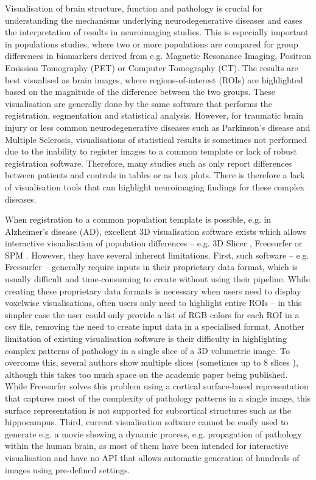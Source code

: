 \documentclass{llncs}
\begin{document}
Visualisation of brain structure, function and pathology is crucial for understanding the mechanisms underlying neurodegenerative diseases and eases the interpretation of results in neuroimaging studies. This is especially important in populations studies, where two or more populations are compared for group differences in biomarkers derived from e.g. Magnetic Resonance Imaging, Positron Emission Tomography (PET) or Computer Tomography (CT). The results are best visualised as brain images, where regions-of-interest (ROIs) are highlighted based on the magnitude of the difference between the two groups. These visualisation are generally done by the same software that performs the registration, segmentation and statistical analysis. However, for traumatic brain injury or less common neurodegenerative diseases such as Parkinson's disease and Multiple Sclerosis, visualisations of statistical results is sometimes not performed due to the inability to register images to a common template or lack of robust registration software. Therefore, many studies such as \cite{coughlin2015neuroinflammation,mak2014subcortical,schoonheim2012subcortical} only report differences between patients and controls in tables or as box plots. There is therefore a lack of visualisation tools that can highlight neuroimaging findings for these complex diseases.

When registration to a common population template is possible, e.g. in Alzheimer's disease (AD), excellent 3D visualisation software exists  which allows interactive visualisation of population differences -- e.g. 3D Slicer \cite{pieper20043d}, Freesurfer \cite{fischl2012freesurfer} or SPM \cite{penny2011statistical}. However, they have several inherent limitations. First, such software -- e.g. Freesurfer -- generally require inputs in their proprietary data format, which is usually difficult and time-consuming to create without using their pipeline. While creating these proprietary data formats is necessary when users need to display voxelwise visualisations, often users only need to highlight entire ROIs -- in this simpler case the user could only provide a list of RGB colors for each ROI in a csv file, removing the need to create input data in a specialised format. Another limitation of existing visualisation software is their difficulty in highlighting complex patterns of pathology in a single slice of a 3D volumetric image. To overcome this, several authors show multiple slices (sometimes up to 8 slices \cite{migliaccio2015mapping}), although this takes too much space on the academic paper being published. While Freesurfer solves this problem using a cortical surface-based representation that captures most of the complexity of pathology patterns in a single image, this surface representation is not supported for subcortical structures such as the hippocampus. Third, current visualisation software cannot be easily used to generate e.g. a movie showing a dynamic process, e.g. propagation of pathology within the human brain, as most of them have been intended for interactive visualisation and have no API that allows automatic generation of hundreds of images using pre-defined settings. 
\end{document}
